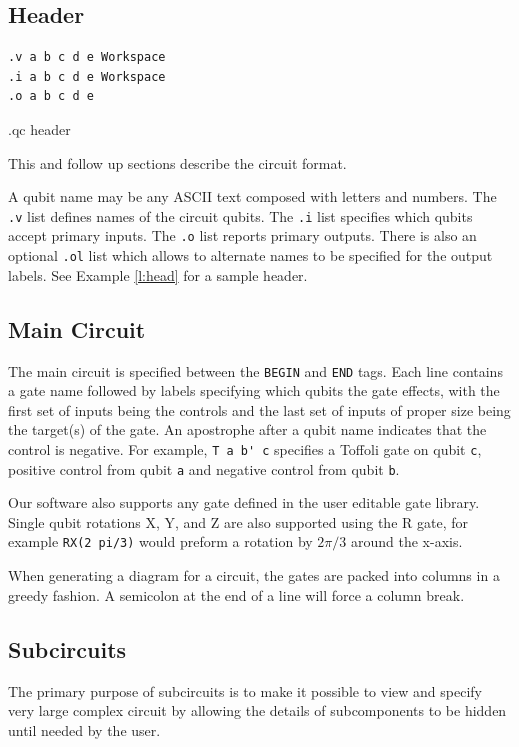 \documentclass[aps,prl,reprint,floatfix,superscriptaddress]{revtex4-1} %
\begin{document}
\subsection{Header}
\begin{program}
\begin{verbatim}
.v a b c d e Workspace
.i a b c d e Workspace
.o a b c d e
\end{verbatim}
\caption{.qc header}
\label{l:head}
\end{program}
This and follow up sections describe the circuit format. 

A qubit name may be any ASCII text composed with letters and numbers. 
The \verb+.v+ list defines names of the circuit qubits.
The \verb+.i+ list specifies which qubits accept primary inputs.
The \verb+.o+ list reports primary outputs.
There is also an optional \verb+.ol+ list which allows to alternate names to be specified for the output labels.
See Example \ref{l:head} for a sample header.

\subsection{Main Circuit}
The main circuit is specified between the \verb+BEGIN+ and \verb+END+ tags.
Each line contains a gate name followed by labels specifying which qubits the gate effects, with the first set of inputs being the controls and the last set of inputs of proper size being the target(s) of the gate.
An apostrophe after a qubit name indicates that the control is negative. 
For example, \verb+T a b' c+ specifies a Toffoli gate on qubit \verb+c+, positive control from qubit \verb+a+ and negative control from qubit \verb+b+. 

Our software also supports any gate defined in the user editable gate library.
Single qubit rotations X, Y, and Z are also supported using the R gate, for example \verb+RX(2 pi/3)+ would preform a rotation by $2\pi/3$ around the x-axis. 

When generating a diagram for a circuit, the gates are packed into columns in a greedy fashion. 
A semicolon at the end of a line will force a column break.

\subsection{Subcircuits}
The primary purpose of subcircuits is to make it possible to view and specify very large complex circuit by allowing the details of subcomponents to be hidden until needed by the user.
\end{document}
